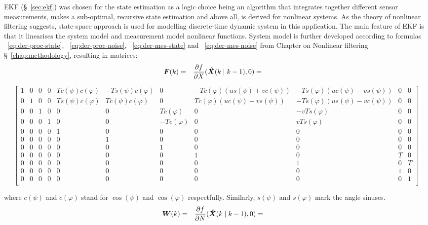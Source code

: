 EKF (\S~\ref{sec:ekf}) was chosen for the state estimation as a logic choice being an algorithm that integrates together different sensor measurements, makes a sub-optimal, recursive state estimation and above all, is derived for nonlinear systems. As the theory of nonlinear filtering suggests, state-space approach is used for modelling discrete-time dynamic system in this application. The main feature of EKF is that it linearises the system model and measurement model nonlinear functions. System model is further developed according to formulas ~\ref{eq:der-proc-state}, ~\ref{eq:der-proc-noise}, ~\ref{eq:der-mes-state} and ~\ref{eq:der-mes-noise} from Chapter on Nonlinear filtering \S~\ref{chap:methodology}, resulting in matrices:
\begin{align*}
\boldsymbol{F}(k) & = &  \frac{\partial f}{\partial X} (\boldsymbol{\hat{X}}(k \mid k-1), 0) & = & 
\end{align*}
\begin{footnotesize}
$$ \left[ 
\begin{array}{ccccccccccc}
1 & 0 & 0 & 0 & T c(\psi) c(\varphi) & -T s(\psi) c(\varphi) & 0 & -Tc(\varphi)(us(\psi)+vc(\psi)) & -Ts(\varphi)(uc(\psi)-vs(\psi)) & 0 & 0 \\
0 & 1 & 0 & 0 & T s(\psi) c(\varphi) & T c(\psi) c(\varphi) & 0 & Tc(\varphi)(uc(\psi)-vs(\psi)) & -Ts(\varphi)(us(\psi)-vc(\psi))  & 0 & 0 \\
0 & 0 & 1 & 0 & 0 & 0 &  Tc(\varphi) & 0 & -vTs(\varphi) & 0 & 0 \\
0 & 0 & 0 & 1 & 0 & 0 & -Tc(\varphi) & 0 &  vTs(\varphi) & 0 & 0 \\
0 & 0 & 0 & 0 & 1 & 0 & 0 & 0 & 0 & 0 & 0 \\
0 & 0 & 0 & 0 & 0 & 1 & 0 & 0 & 0 & 0 & 0 \\
0 & 0 & 0 & 0 & 0 & 0 & 1 & 0 & 0 & 0 & 0 \\
0 & 0 & 0 & 0 & 0 & 0 & 0 & 1 & 0 & T & 0 \\
0 & 0 & 0 & 0 & 0 & 0 & 0 & 0 & 1 & 0 & T \\
0 & 0 & 0 & 0 & 0 & 0 & 0 & 0 & 0 & 1 & 0 \\
0 & 0 & 0 & 0 & 0 & 0 & 0 & 0 & 0 & 0 & 1 \\
\end{array}
\right] $$ 
\end{footnotesize}
where $c(\psi)$ and $c(\varphi)$ stand for $\cos(\psi)$ and $\cos(\varphi)$ respectfully. Similarly, $s(\psi)$ and $s(\varphi)$ mark the angle sinuses.  
\begin{align*}
\boldsymbol{W}(k) & = & \frac{\partial f}{\partial N} (\boldsymbol{\hat{X}}(k \mid k-1), 0) & = &
\end{align*}
